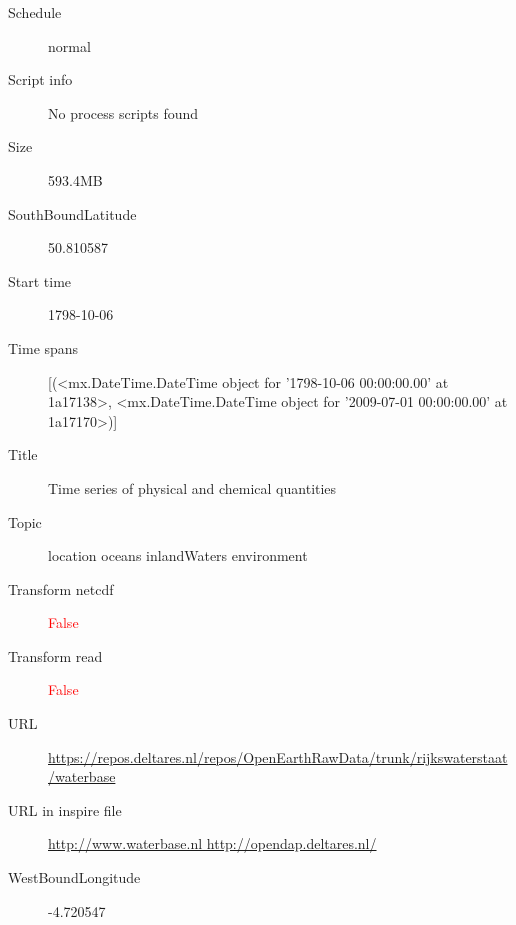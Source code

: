 \documentclass[9]{report}
\begin{document}
\begin{description}
\begin{verbatim}
\end{verbatim}
  \item[Schedule] normal
  \item[Script info] No process scripts found
  \item[Size] 593.4MB
  \item[SouthBoundLatitude] 50.810587
  \item[Start time] 1798-10-06
  \item[Time spans] [(<mx.DateTime.DateTime object for '1798-10-06 00:00:00.00' at 1a17138>, <mx.DateTime.DateTime object for '2009-07-01 00:00:00.00' at 1a17170>)]
  \item[Title]  Time series of physical and chemical quantities 
  \item[Topic] location oceans inlandWaters environment
  \item[Transform netcdf] \textcolor{red}{False}
  \item[Transform read] \textcolor{red}{False}
  \item[URL] \href{https://repos.deltares.nl/repos/OpenEarthRawData/trunk/rijkswaterstaat/waterbase}{https://repos.deltares.nl/repos/OpenEarthRawData/trunk/rijkswaterstaat/waterbase}
  \item[URL in inspire file] \href{http://www.waterbase.nl http://opendap.deltares.nl/}{http://www.waterbase.nl http://opendap.deltares.nl/}
  \item[WestBoundLongitude] -4.720547
\end{description}
\end{document}
